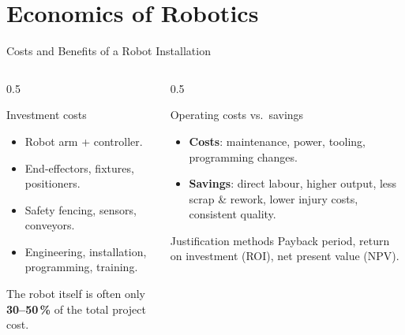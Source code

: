 \documentclass[aspectratio=169]{beamer}
\begin{document}
	\section{Economics of Robotics}
	\begin{frame}{Costs and Benefits of a Robot Installation}
		\begin{columns}[T]
			\begin{column}{0.5\textwidth}
				\begin{block}{Investment costs}
					\begin{itemize}\small
						\item Robot arm + controller.
						\item End-effectors, fixtures, positioners.
						\item Safety fencing, sensors, conveyors.
						\item Engineering, installation, programming, training.
					\end{itemize}
					\footnotesize The robot itself is often only \textbf{30--50\,\%} of the total project cost.
				\end{block}
			\end{column}
			\begin{column}{0.5\textwidth}
				\begin{block}{Operating costs vs.\ savings}
					\begin{itemize}\small
						\item \textbf{Costs}: maintenance, power, tooling, programming changes.
						\item \textbf{Savings}: direct labour, higher output, less scrap \& rework, lower injury costs, consistent quality.
					\end{itemize}
				\end{block}
				\begin{block}{Justification methods}
					\small Payback period, return on investment (ROI), net present value (NPV).
				\end{block}
			\end{column}
		\end{columns}
	\end{frame}
\end{document}

